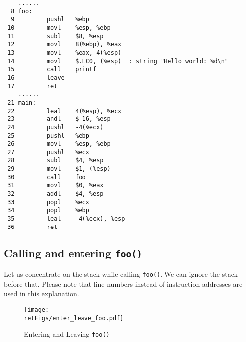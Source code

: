 \begin{lstlisting}
    ......
  8 foo:
  9         pushl   %ebp
 10         movl    %esp, %ebp
 11         subl    $8, %esp
 12         movl    8(%ebp), %eax   
 13         movl    %eax, 4(%esp)
 14         movl    $.LC0, (%esp)  : string "Hello world: %d\n"
 15         call    printf
 16         leave
 17         ret
    ......
 21 main:
 22         leal    4(%esp), %ecx
 23         andl    $-16, %esp
 24         pushl   -4(%ecx)
 25         pushl   %ebp
 26         movl    %esp, %ebp
 27         pushl   %ecx
 28         subl    $4, %esp
 29         movl    $1, (%esp)
 30         call    foo
 31         movl    $0, %eax
 32         addl    $4, %esp
 33         popl    %ecx
 34         popl    %ebp
 35         leal    -4(%ecx), %esp
 36         ret
\end{lstlisting}
 


\subsection{Calling and entering {\tt foo()}}

Let us concentrate on the stack while calling {\tt foo()}. We can ignore the stack
before that. Please note that line numbers instead of instruction addresses are
used in this explanation. 



\begin{figure}[htb]
	\centering
	\texttt{[image: \\retFigs/enter\_leave\_foo.pdf]}
	\caption{Entering and Leaving {\tt foo()}}
	\label{fig:enter_leave_foo}
\end{figure}


